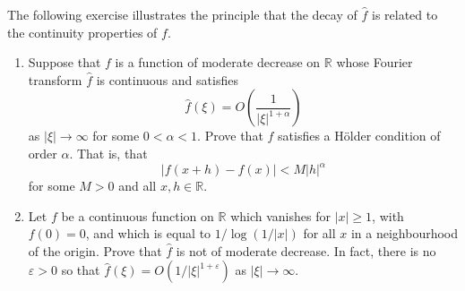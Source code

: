\documentclass[12 pt, letterpaper]{hmcpset}
\begin{document}
\pagebreak

\begin{problem}[S \& S \S 5.5 \#3]
	The following exercise illustrates the principle that the decay of $\hat{f}$ is related to the continuity properties of $f$.
	\begin{enumerate}
		\item Suppose that $f$ is a function of moderate decrease on $\mathbb{R}$ whose Fourier transform $\hat{f}$ is continuous and satisfies
			\[
				\hat{f}(\xi) = O\left ( \frac{1}{\lvert \xi \rvert^{1 + \alpha}} \right )
			\]
			as $\lvert \xi \rvert \to \infty$ for some $0 < \alpha < 1$. Prove that $f$ satisfies a H\"older condition of order $\alpha$. That is, that
			\[
				\lvert f(x + h) - f(x) \rvert < M \lvert h \rvert^{\alpha}
			\]
			for some $M > 0$ and all $x, h \in \mathbb{R}$.
		\item Let $f$ be a continuous function on $\mathbb{R}$ which vanishes for $\lvert x \rvert \ge 1$, with $f(0) = 0$, and which is equal to $1 / \log(1 / \lvert x \rvert)$ for all $x$ in a neighbourhood of the origin. Prove that $\hat{f}$ is not of moderate decrease. In fact, there is no $\varepsilon > 0$ so that $\hat{f}(\xi) = O(1 / \lvert \xi \rvert^{1 + \varepsilon})$ as $\lvert \xi \rvert \to \infty$.
	\end{enumerate}
\end{problem}
\end{document}
